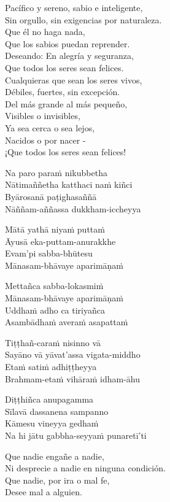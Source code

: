 Pacífico y sereno, sabio e inteligente,\\
Sin orgullo, sin exigencias por naturaleza.\\
Que él no haga nada,\\
Que los sabios puedan reprender.\\
Deseando: En alegría y seguranza,\\
Que todos los seres sean felices.\\
Cualquieras que sean los seres vivos,\\
Débiles, fuertes, sin excepción.\\
Del más grande al más pequeño,\\
Visibles o invisibles,\\
Ya sea cerca o sea lejos,\\
Nacidos o por nacer -\\
¡Que todos los seres sean felices!

\clearpage

Na paro paraṁ nikubbetha\\
Nātimaññetha katthaci naṁ kiñci\\
Byārosanā paṭighasaññā\\
Nāññam-aññassa dukkham-iccheyya

Mātā yathā niyaṁ puttaṁ\\
Āyusā eka-puttam-anurakkhe\\
Evam'pi sabba-bhūtesu\\
Mānasam-bhāvaye aparimāṇaṁ

Mettañca sabba-lokasmiṁ\\
Mānasam-bhāvaye aparimāṇaṁ\\
Uddhaṁ adho ca tiriyañca\\
Asambādhaṁ averaṁ asapattaṁ

Tiṭṭhañ-caraṁ nisinno vā\\
Sayāno vā yāvat'assa vigata-middho\\
Etaṁ satiṁ adhiṭṭheyya\\
Brahmam-etaṁ vihāraṁ idham-āhu

Diṭṭhiñca anupagamma\\
Sīlavā dassanena sampanno\\
Kāmesu vineyya gedhaṁ\\
Na hi jātu gabbha-seyyaṁ punaretī'ti

\clearpage

Que nadie engañe a nadie,\\
Ni desprecie a nadie en ninguna condición.\\
Que nadie, por ira o mal fe,\\
Desee mal a alguien.


